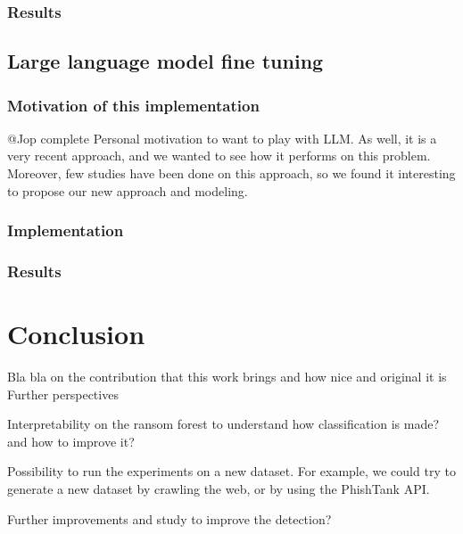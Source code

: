 \documentclass{article}
\begin{document}
    \subsubsection{Results}

    \subsection{Large language model fine tuning}\label{subsec:large-language-model-finetuning}

    \subsubsection{Motivation of this implementation}
    @Jop complete
    Personal motivation to want to play with LLM. As well, it is a very recent approach, and we wanted to see how it performs on this problem.
    Moreover, few studies have been done on this approach, so we found it interesting to propose our new approach and modeling.

    \subsubsection{Implementation}


    \subsubsection{Results}


    \section{Conclusion}\label{sec:conclusion}

    Bla bla on the contribution that this work brings and how nice and original it is
    Further perspectives

    Interpretability on the ransom forest to understand how classification is made? and how to improve it?

    Possibility to run the experiments on a new dataset.
    For example, we could try to generate a new dataset by crawling the web, or by using the PhishTank API.

    Further improvements and study to improve the detection?

    
    
\end{document}
